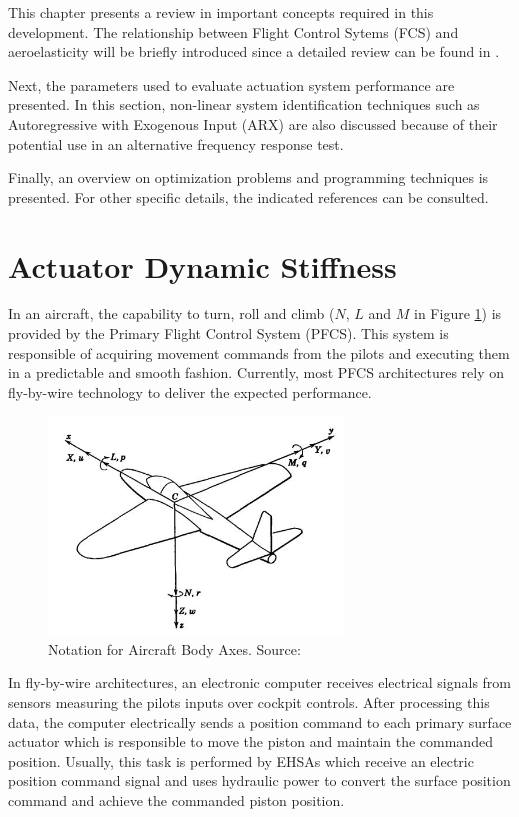 
This chapter presents a review in important concepts required in this development. The relationship between Flight Control Sytems (FCS) and aeroelasticity will be briefly introduced since a detailed review can be found in . 

Next, the parameters used to evaluate actuation system performance are presented. In this section, non-linear system identification techniques such as Autoregressive with Exogenous Input (ARX) are also discussed because of their potential use in an alternative frequency response test. 

Finally, an overview on optimization problems and programming techniques is presented. For other specific details, the indicated references can be consulted.

\section{Actuator Dynamic Stiffness}

In an aircraft, the capability to turn, roll and climb ($N$, $L$ and $M$ in Figure \ref{fig:2_1_AirplaneAxis}) is provided by the Primary Flight Control System (PFCS). This system is responsible of acquiring movement commands from the pilots and executing them in a predictable and smooth fashion. Currently, most PFCS architectures rely on fly-by-wire technology to deliver the expected performance.

\begin{figure}[H]
	\centering
	\centerline{\includegraphics[width=0.7\textwidth]{Figuras/2.TheoryBackground/2-1-AirplaneAxis.jpg}}
	\caption{Notation for Aircraft Body Axes. Source: }
	\label{fig:2_1_AirplaneAxis}
\end{figure}

In fly-by-wire architectures, an electronic computer receives electrical signals from sensors measuring the pilots inputs over cockpit controls. After processing this data, the computer electrically sends a position command to each primary surface actuator which is responsible to move the piston and maintain the commanded position. Usually, this task is performed by EHSAs which receive an electric position command signal and uses hydraulic power to convert the surface position command and achieve the commanded piston position.

